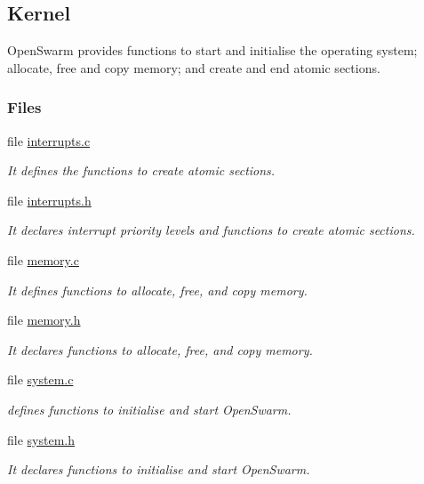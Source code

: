 \hypertarget{group__base}{}\subsection{Kernel}
\label{group__base}


Open\+Swarm provides functions to start and initialise the operating system; allocate, free and copy memory; and create and end atomic sections.  


\subsubsection*{Files}
\begin{DoxyCompactItemize}
\item 
file \hyperlink{interrupts_8c}{interrupts.\+c}
\begin{DoxyCompactList}\small\item\em It defines the functions to create atomic sections. \end{DoxyCompactList}\item 
file \hyperlink{interrupts_8h}{interrupts.\+h}
\begin{DoxyCompactList}\small\item\em It declares interrupt priority levels and functions to create atomic sections. \end{DoxyCompactList}\item 
file \hyperlink{memory_8c}{memory.\+c}
\begin{DoxyCompactList}\small\item\em It defines functions to allocate, free, and copy memory. \end{DoxyCompactList}\item 
file \hyperlink{memory_8h}{memory.\+h}
\begin{DoxyCompactList}\small\item\em It declares functions to allocate, free, and copy memory. \end{DoxyCompactList}\item 
file \hyperlink{system_8c}{system.\+c}
\begin{DoxyCompactList}\small\item\em defines functions to initialise and start Open\+Swarm. \end{DoxyCompactList}\item 
file \hyperlink{system_8h}{system.\+h}
\begin{DoxyCompactList}\small\item\em It declares functions to initialise and start Open\+Swarm. \end{DoxyCompactList}\end{DoxyCompactItemize}


